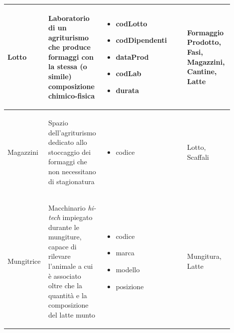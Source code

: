 \documentclass[12pt,a4paper]{article}
\begin{document}
\begin{center}
\begin{longtable}{|p{0.14\linewidth}|p{0.20\linewidth}|p{0.36\linewidth}|p{0.20\linewidth}|}
\hline
Lotto				 	& \begin{flushleft}\vspace{-25pt} Laboratorio di un agriturismo che produce formaggi con la stessa (o simile) composizione chimico-fisica \end{flushleft}
					& \begin{itemize}
						\setlength{\itemindent}{-1em}
						\vspace{-25pt}
						\setlength\itemsep{-0.25em}
						\item codLotto
						\item codDipendenti
						\item dataProd
						\item codLab
						\item durata
					\end{itemize}
					& \begin{flushleft}\vspace{-25pt} Formaggio Prodotto, Fasi, Magazzini, Cantine, Latte \end{flushleft} \\ 

\hline
Magazzini				 	& \begin{flushleft}\vspace{-25pt} Spazio dell'agriturismo dedicato allo stoccaggio dei formaggi che non necessitano di stagionatura \end{flushleft}
					& \begin{itemize}
						\setlength{\itemindent}{-1em}
						\vspace{-25pt}
						\setlength\itemsep{-0.25em}
						\item codice
					\end{itemize}
					& \begin{flushleft}\vspace{-25pt} Lotto, Scaffali \end{flushleft} \\ 

\hline
Mungitrice				 	& \begin{flushleft}\vspace{-25pt} Macchinario \textit{hi-tech} impiegato durante le mungiture, capace di rilevare l'animale a cui è associato oltre che la quantità e la composizione del latte munto \end{flushleft}
					& \begin{itemize}
						\setlength{\itemindent}{-1em}
						\vspace{-25pt}
						\setlength\itemsep{-0.25em}
						\item codice
						\item marca
						\item modello
						\item posizione
					\end{itemize}
					& \begin{flushleft}\vspace{-25pt} Mungitura, Latte \end{flushleft} \\ 


\end{longtable}
\end{center}
\end{document}
